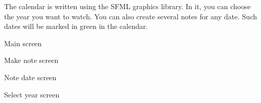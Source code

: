 The calendar is written using the SFML graphics library. In it, you can choose the year you want to watch. You can also create several notes for any date. Such dates will be marked in green in the calendar. 

Main screen 

 

Make note screen 

 

Note date screen 

 

Select year screen 

 